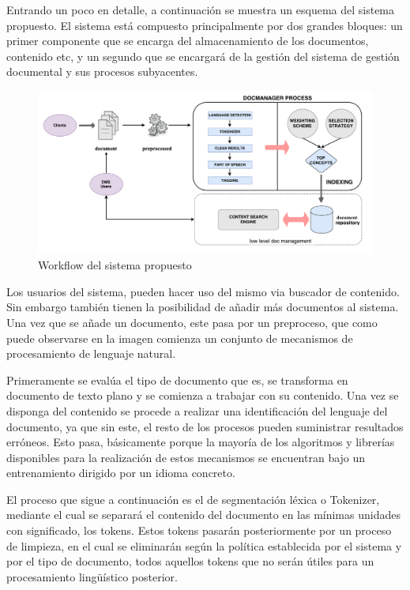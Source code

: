 \documentclass[runningheads,a4paper]{llncs}
\theoremstyle{break}
\begin{document}
Entrando un poco en detalle, a continuación se muestra un esquema del sistema propuesto. El sistema está compuesto principalmente por dos grandes bloques: un primer componente que se encarga del almacenamiento de los documentos, contenido etc, y un segundo que se encargará de la gestión del sistema de gestión documental y sus procesos subyacentes.

\begin{figure}
\includegraphics[scale=0.35]{img/propuesta_workflow.pdf}
\caption[Workflow del sistema propuesto]{Workflow del sistema propuesto}
\label{fig:standar_workflow}
\end{figure}

Los usuarios del sistema, pueden hacer uso del mismo via buscador de contenido. Sin embargo también tienen la posibilidad de añadir más documentos al sistema. Una vez que se añade un documento, este pasa por un preproceso, que como puede observarse en la imagen comienza un conjunto de mecanismos de procesamiento de lenguaje natural. 

\pagebreak

Primeramente se evalúa el tipo de documento que es, se transforma en documento de texto plano y se comienza a trabajar con su contenido. Una vez se disponga del contenido se procede a realizar una identificación del lenguaje del documento, ya que sin este, el resto de los procesos pueden  suministrar resultados erróneos. Esto pasa, básicamente porque la mayoría de los algoritmos y librerías disponibles para la realización de estos mecanismos se encuentran bajo un entrenamiento dirigido por un idioma concreto.

El proceso que sigue a continuación es el de segmentación léxica o Tokenizer, mediante el cual se separará el contenido del documento en las mínimas unidades con significado, los tokens. Estos tokens pasarán posteriormente por un proceso de limpieza, en el cual se eliminarán según la política establecida por el sistema y por el tipo de documento, todos aquellos tokens que no serán útiles para un procesamiento lingüístico posterior.
\end{document}
